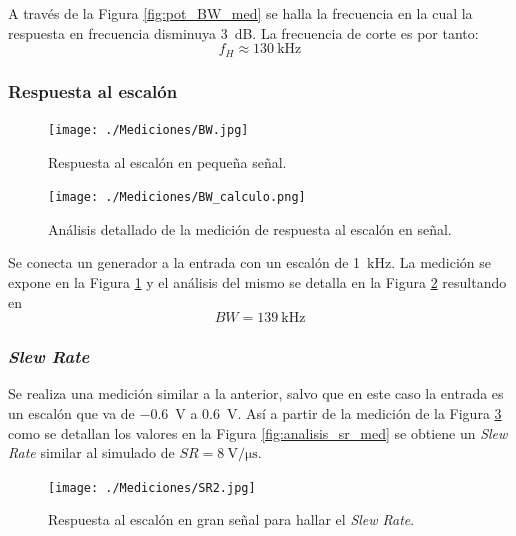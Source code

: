 		
		A través de la Figura \ref{fig:pot_BW_med} se halla la frecuencia en la cual la respuesta en frecuencia disminuya \SI{3}{\dB}. La frecuencia de corte es por tanto:
		\begin{equation*}
			\boxed{f_H \approx \SI{130}{\kHz}}
		\end{equation*}

		\subsubsection{Respuesta al escalón}
		\begin{figure}[h!]
			\centering
			\texttt{[image: ./Mediciones/BW.jpg]}
			\caption{Respuesta al escalón en pequeña señal.}
			\label{fig:escalon_ss}
		\end{figure}

		\begin{figure}[h!]
			\centering
			\texttt{[image: ./Mediciones/BW\_calculo.png]}
			\caption{Análisis detallado de la medición de respuesta al escalón en señal.}
			\label{fig:analisis_escalon_ss}
		\end{figure}

		Se conecta un generador a la entrada con un escalón de \SI{1}{\kHz}. La medición se expone en la Figura \ref{fig:escalon_ss} y el análisis del mismo se detalla en la Figura \ref{fig:analisis_escalon_ss} resultando en
		\begin{equation*}
			\boxed{BW = \SI{139}{\kHz}}
		\end{equation*}

		\subsubsection{\emph{Slew Rate}}
		Se realiza una medición similar a la anterior, salvo que en este caso la entrada es un escalón que va de \SI{-.6}{\V} a \SI{.6}{\V}. Así a partir de la medición de la Figura \ref{fig:sr_med} como se detallan los valores en la Figura \ref{fig:analisis_sr_med} se obtiene un \emph{Slew Rate} similar al simulado de $\boxed{SR = \SI{8}{\V\per\micro\second}}$.

		\begin{figure}[h!]
			\centering
			\texttt{[image: ./Mediciones/SR2.jpg]}
			\caption{Respuesta al escalón en gran señal para hallar el \emph{Slew Rate}.}
			\label{fig:sr_med}
		\end{figure}

